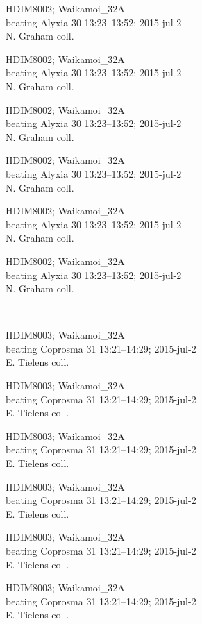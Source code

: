 \documentclass[2pt]{extarticle}
\begin{document}
\noindent
\parbox{0.16\textwidth}{\tiny \raggedright \rule[-0.3\baselineskip]{0pt}{10pt}HDIM8002; Waikamoi\_32A\\ beating Alyxia 30 13:23--13:52; 2015-jul-2\\ N. Graham coll.}
\parbox{0.16\textwidth}{\tiny \raggedright \rule[-0.3\baselineskip]{0pt}{10pt}HDIM8002; Waikamoi\_32A\\ beating Alyxia 30 13:23--13:52; 2015-jul-2\\ N. Graham coll.}
\parbox{0.16\textwidth}{\tiny \raggedright \rule[-0.3\baselineskip]{0pt}{10pt}HDIM8002; Waikamoi\_32A\\ beating Alyxia 30 13:23--13:52; 2015-jul-2\\ N. Graham coll.}
\parbox{0.16\textwidth}{\tiny \raggedright \rule[-0.3\baselineskip]{0pt}{10pt}HDIM8002; Waikamoi\_32A\\ beating Alyxia 30 13:23--13:52; 2015-jul-2\\ N. Graham coll.}
\parbox{0.16\textwidth}{\tiny \raggedright \rule[-0.3\baselineskip]{0pt}{10pt}HDIM8002; Waikamoi\_32A\\ beating Alyxia 30 13:23--13:52; 2015-jul-2\\ N. Graham coll.}
\parbox{0.16\textwidth}{\tiny \raggedright \rule[-0.3\baselineskip]{0pt}{10pt}HDIM8002; Waikamoi\_32A\\ beating Alyxia 30 13:23--13:52; 2015-jul-2\\ N. Graham coll.} \\ 
\vspace{0.001in} 

\noindent
\parbox{0.16\textwidth}{\tiny \raggedright \rule[-0.3\baselineskip]{0pt}{10pt}HDIM8003; Waikamoi\_32A\\ beating Coprosma 31 13:21--14:29; 2015-jul-2\\ E. Tielens coll.}
\parbox{0.16\textwidth}{\tiny \raggedright \rule[-0.3\baselineskip]{0pt}{10pt}HDIM8003; Waikamoi\_32A\\ beating Coprosma 31 13:21--14:29; 2015-jul-2\\ E. Tielens coll.}
\parbox{0.16\textwidth}{\tiny \raggedright \rule[-0.3\baselineskip]{0pt}{10pt}HDIM8003; Waikamoi\_32A\\ beating Coprosma 31 13:21--14:29; 2015-jul-2\\ E. Tielens coll.}
\parbox{0.16\textwidth}{\tiny \raggedright \rule[-0.3\baselineskip]{0pt}{10pt}HDIM8003; Waikamoi\_32A\\ beating Coprosma 31 13:21--14:29; 2015-jul-2\\ E. Tielens coll.}
\parbox{0.16\textwidth}{\tiny \raggedright \rule[-0.3\baselineskip]{0pt}{10pt}HDIM8003; Waikamoi\_32A\\ beating Coprosma 31 13:21--14:29; 2015-jul-2\\ E. Tielens coll.}
\parbox{0.16\textwidth}{\tiny \raggedright \rule[-0.3\baselineskip]{0pt}{10pt}HDIM8003; Waikamoi\_32A\\ beating Coprosma 31 13:21--14:29; 2015-jul-2\\ E. Tielens coll.} \\ 
\vspace{0.001in} 
\end{document}
